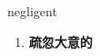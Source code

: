
\begin{frame}
{\huge negligent}
\begin{center}
\begin{enumerate}\Large
  \item \textbf{疏忽大意的}
\end{enumerate}
\end{center}
\end{frame}
